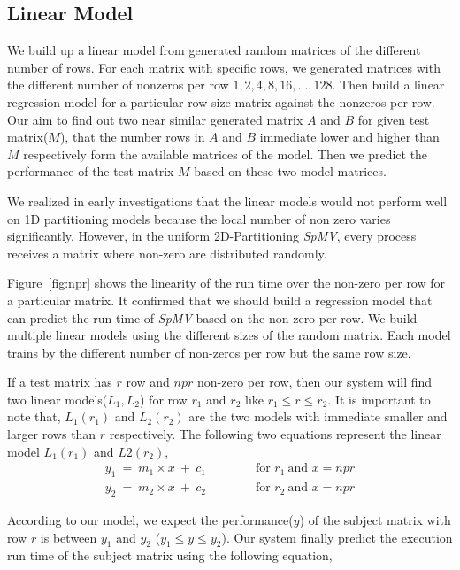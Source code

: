 \documentclass[conference, 10ppt]{IEEEtran}
\begin{document}
\subsection{Linear Model}
\label{sec:linear-2d-spmv}
We build up a linear model from generated random matrices of the different
number of rows. For each matrix with specific rows, we generated
matrices with the different number of nonzeros per row $1, 2, 4, 8, 16,
\dots, 128$. Then build a linear regression model for a particular row
size matrix against the nonzeros per row. Our aim to find out two near
similar generated matrix $A$ and $B$ for given test matrix($M$), that
the number rows in $A$ and $B$ immediate lower and higher than $M$
respectively form the available matrices of the model. Then we predict
the performance of the test matrix $M$ based on these two model
matrices.

We realized in early investigations that the linear models would not
perform well on 1D partitioning models because the local number of non
zero varies significantly. However, in the uniform 2D-Partitioning
\textit{SpMV}, every process receives a matrix where non-zero are
distributed randomly.

Figure~\ref{fig:npr} shows the linearity of the run time over the
non-zero per row for a particular matrix. It confirmed that we should
build a regression model that can predict the run time of
\textit{SpMV} based on the non zero per row. We build multiple linear
models using the different sizes of the random matrix. Each model
trains by the different number of non-zeros per row but the same row
size.

If a test matrix has $r$ row and $npr$ non-zero per row, then our
system will find two linear models($L_1, L_2$) for row $r_1$ and $r_2$
like $r_1\leq r\leq r_2$.  It is important to note that, $L_1(r_1)$
and $L_2(r_2)$ are the two models with immediate smaller and larger rows
than $r$ respectively.  The following two equations represent the
linear model $L_1(r_1)$ and $L2(r_2)$,
\begin{equation*}
\begin{array}{l}
y_1\ =\ m_1\times x\ +\ c_1  \qquad\qquad\text{for } r_1 \ \text{and } x=npr\\
y_2\ =\ m_2\times x\ +\ c_2  \qquad\qquad\text{for } r_2 \ \text{and } x=npr
\end{array}
\end{equation*}

According to our model, we expect the performance($y$) of the subject
matrix with row $r$ is between $y_1$ and $y_2$ ($y_1\leq y\leq
y_2$). Our system finally predict the execution run time of the
subject matrix using the following equation,
\end{document}
